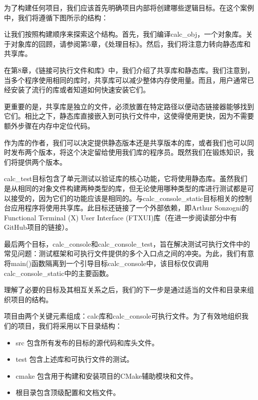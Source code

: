 
为了构建任何项目，我们应该首先明确项目内部将创建哪些逻辑目标。在这个案例中，我们将遵循下图所示的结构：


让我们按照构建顺序来探索这个结构。首先，我们编译calc\_obj，一个对象库。关于对象库的回顾，请参阅第5章，《处理目标》。然后，我们将注意力转向静态库和共享库。


在第8章，《链接可执行文件和库》中，我们介绍了共享库和静态库。我们注意到，当多个程序使用相同的库时，共享库可以减少整体内存使用量。而且，用户通常已经安装了流行的库或者知道如何快速安装它们。

更重要的是，共享库是独立的文件，必须放置在特定路径以便动态链接器能够找到它们。相比之下，静态库直接嵌入到可执行文件中，这使得使用更快，因为不需要额外步骤在内存中定位代码。

作为库的作者，我们可以决定提供静态版本还是共享版本的库，或者我们也可以同时发布两个版本，将这个决定留给使用我们库的程序员。既然我们在锻炼知识，我们将提供两个版本。

calc\_test目标包含了单元测试以验证库的核心功能，它将使用静态库。虽然我们是从相同的对象文件构建两种类型的库，但无论使用哪种类型的库进行测试都是可以接受的，因为它们的功能应该是相同的。与calc\_console\_static目标相关的控制台应用程序将使用共享库。此目标还链接了一个外部依赖，即Arthur Sonzogni的Functional Terminal (X) User Interface (FTXUI)库（在进一步阅读部分中有GitHub项目的链接）。

最后两个目标，calc\_console和calc\_console\_test，旨在解决测试可执行文件中的常见问题：测试框架和可执行文件提供的多个入口点之间的冲突。为此，我们有意将main()函数隔离到一个引导目标calc\_console中，该目标仅仅调用calc\_console\_static中的主要函数。

理解了必要的目标及其相互关系之后，我们的下一步是通过适当的文件和目录来组织项目的结构。


项目由两个关键元素组成：calc库和calc\_console可执行文件。为了有效地组织我们的项目，我们将采用以下目录结构：

\begin{itemize}
\item
src 包含所有发布的目标的源代码和库头文件。

\item
test 包含上述库和可执行文件的测试。

\item
cmake 包含用于构建和安装项目的CMake辅助模块和文件。

\item
根目录包含顶级配置和文档文件。
\end{itemize}

